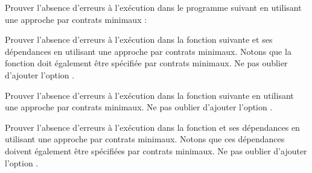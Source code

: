 



Prouver l'absence d'erreurs à l'exécution dans le programme suivant en utilisant
une approche par contrats minimaux :






Prouver l'absence d'erreurs à l'exécution dans la fonction 
suivante et ses dépendances en utilisant une approche par contrats minimaux.
Notons que la fonction  doit également être spécifiée par
contrats minimaux. Ne pas oublier d'ajouter l'option .







Prouver l'absence d'erreurs à l'exécution dans la fonction 
suivante en utilisant une approche par contrats minimaux. Ne pas oublier d'ajouter
l'option .






Prouver l'absence d'erreurs à l'exécution dans la fonction 
et ses dépendances en utilisant une approche par contrats minimaux. Notons que
ces dépendances doivent également être spécifiées par contrats minimaux. Ne pas
oublier d'ajouter l'option .


